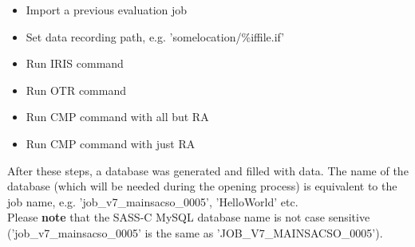\begin{itemize}  
\item Import a previous evaluation job
\item Set data recording path, e.g. 'somelocation/\%iffile.if'
\item Run IRIS command
\item Run OTR command
\item Run CMP command with all but RA
\item Run CMP command with just RA
\end{itemize}

After  these  steps,  a  database  was  generated  and  filled  with  data.   The  name  of  the  database  (which
will  be  needed  during  the  opening  process)  is  equivalent  to  the  job  name,  e.g.   'job\_v7\_mainsacso\_0005', 'HelloWorld' etc. \\

Please \textbf{note} that the SASS-C MySQL database name is not case sensitive ('job\_v7\_mainsacso\_0005' is the same as 'JOB\_V7\_MAINSACSO\_0005').
 
